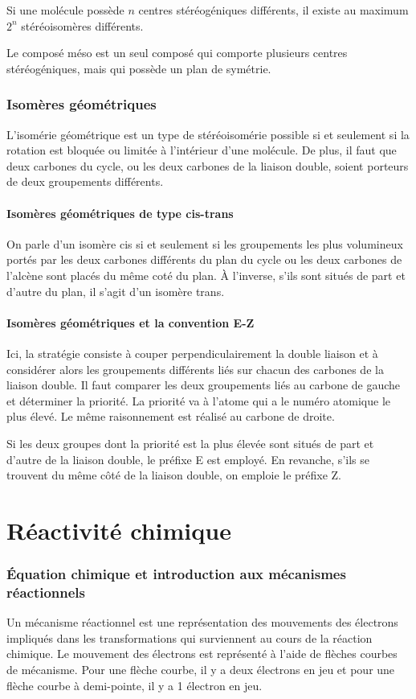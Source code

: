 Si une molécule possède $n$ centres stéréogéniques différents, il existe au maximum $2^n$ stéréoisomères différents.

Le composé méso est un seul composé qui comporte plusieurs centres stéréogéniques, mais qui possède un plan de symétrie.


\section{Isomères géométriques}

L'isomérie géométrique est un type de stéréoisomérie possible si et seulement si la rotation est bloquée ou limitée à l'intérieur d'une molécule.
De plus, il faut que deux carbones du cycle, ou les deux carbones de la liaison double, soient porteurs de deux groupements différents.
\subsection{Isomères géométriques de type cis-trans}

On parle d'un isomère cis si et seulement si les groupements les plus volumineux portés par les deux carbones différents du plan du cycle ou les deux carbones de l'alcène sont placés du même coté du plan.
\`A l'inverse, s'ils sont situés de part et d'autre du plan, il s'agit d'un isomère trans.
\subsection{Isomères géométriques et la convention E-Z} Ici, la stratégie consiste à couper perpendiculairement la double liaison et à considérer alors les groupements différents liés sur chacun des carbones de la liaison double.
Il faut comparer les deux groupements liés au carbone de gauche et déterminer la priorité.
La priorité va à l'atome qui a le numéro atomique le plus élevé.
Le même raisonnement est réalisé au carbone de droite.

Si les deux groupes dont la priorité est la plus élevée sont situés de part et d'autre de la liaison double, le préfixe E est employé.
En revanche, s'ils se trouvent du même côté de la liaison double, on emploie le préfixe Z.

\part{Réactivité chimique}

\section{\'Equation chimique et introduction aux mécanismes réactionnels}
Un mécanisme réactionnel est une représentation des mouvements des électrons impliqués dans les transformations qui surviennent au cours de la réaction chimique.
Le mouvement des électrons est représenté à l'aide de flèches courbes de mécanisme.
Pour une flèche courbe, il y a deux électrons en jeu et pour une flèche courbe à demi-pointe, il y a 1 électron en jeu.

